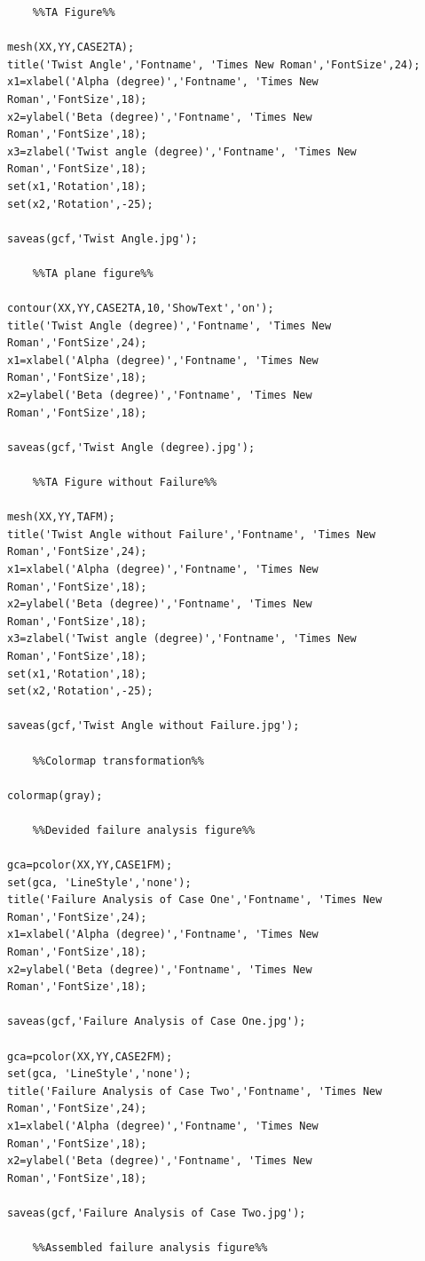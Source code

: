 \documentclass[12pt]{article}
\begin{document}
\begin{minipage}[b]{0.7\linewidth}
\begin{lstlisting}
	%%TA Figure%%

mesh(XX,YY,CASE2TA);
title('Twist Angle','Fontname', 'Times New Roman','FontSize',24);
x1=xlabel('Alpha (degree)','Fontname', 'Times New Roman','FontSize',18);
x2=ylabel('Beta (degree)','Fontname', 'Times New Roman','FontSize',18);
x3=zlabel('Twist angle (degree)','Fontname', 'Times New Roman','FontSize',18);
set(x1,'Rotation',18);
set(x2,'Rotation',-25);

saveas(gcf,'Twist Angle.jpg');

	%%TA plane figure%%

contour(XX,YY,CASE2TA,10,'ShowText','on');
title('Twist Angle (degree)','Fontname', 'Times New Roman','FontSize',24);
x1=xlabel('Alpha (degree)','Fontname', 'Times New Roman','FontSize',18);
x2=ylabel('Beta (degree)','Fontname', 'Times New Roman','FontSize',18);

saveas(gcf,'Twist Angle (degree).jpg');

	%%TA Figure without Failure%%

mesh(XX,YY,TAFM);
title('Twist Angle without Failure','Fontname', 'Times New Roman','FontSize',24);
x1=xlabel('Alpha (degree)','Fontname', 'Times New Roman','FontSize',18);
x2=ylabel('Beta (degree)','Fontname', 'Times New Roman','FontSize',18);
x3=zlabel('Twist angle (degree)','Fontname', 'Times New Roman','FontSize',18);
set(x1,'Rotation',18);
set(x2,'Rotation',-25);

saveas(gcf,'Twist Angle without Failure.jpg');

	%%Colormap transformation%%

colormap(gray);

	%%Devided failure analysis figure%%

gca=pcolor(XX,YY,CASE1FM);
set(gca, 'LineStyle','none');
title('Failure Analysis of Case One','Fontname', 'Times New Roman','FontSize',24);
x1=xlabel('Alpha (degree)','Fontname', 'Times New Roman','FontSize',18);
x2=ylabel('Beta (degree)','Fontname', 'Times New Roman','FontSize',18);

saveas(gcf,'Failure Analysis of Case One.jpg');

gca=pcolor(XX,YY,CASE2FM);
set(gca, 'LineStyle','none');
title('Failure Analysis of Case Two','Fontname', 'Times New Roman','FontSize',24);
x1=xlabel('Alpha (degree)','Fontname', 'Times New Roman','FontSize',18);
x2=ylabel('Beta (degree)','Fontname', 'Times New Roman','FontSize',18);

saveas(gcf,'Failure Analysis of Case Two.jpg');

	%%Assembled failure analysis figure%%


\end{lstlisting}
\end{minipage}
\end{document}
